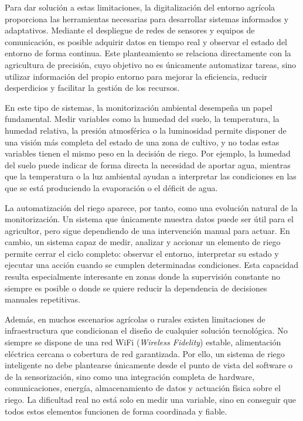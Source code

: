 Para dar solución a estas limitaciones, la digitalización del entorno agrícola proporciona las herramientas necesarias para desarrollar sistemas informados y adaptativos. Mediante el despliegue de redes de sensores y equipos de comunicación, es posible adquirir datos en tiempo real y observar el estado del entorno de forma continua. Este planteamiento se relaciona directamente con la agricultura de precisión, cuyo objetivo no es únicamente automatizar tareas, sino utilizar información del propio entorno para mejorar la eficiencia, reducir desperdicios y facilitar la gestión de los recursos.

En este tipo de sistemas, la monitorización ambiental desempeña un papel fundamental. Medir variables como la humedad del suelo, la temperatura, la humedad relativa, la presión atmosférica o la luminosidad permite disponer de una visión más completa del estado de una zona de cultivo, y no todas estas variables tienen el mismo peso en la decisión de riego. Por ejemplo, la humedad del suelo puede indicar de forma directa la necesidad de aportar agua, mientras que la temperatura o la luz ambiental ayudan a interpretar las condiciones en las que se está produciendo la evaporación o el déficit de agua.

La automatización del riego aparece, por tanto, como una evolución natural de la monitorización. Un sistema que únicamente muestra datos puede ser útil para el agricultor, pero sigue dependiendo de una intervención manual para actuar. En cambio, un sistema capaz de medir, analizar y accionar un elemento de riego permite cerrar el ciclo completo: observar el entorno, interpretar su estado y ejecutar una acción cuando se cumplen determinadas condiciones. Esta capacidad resulta especialmente interesante en zonas donde la supervisión constante no siempre es posible o donde se quiere reducir la dependencia de decisiones manuales repetitivas.

Además, en muchos escenarios agrícolas o rurales existen limitaciones de infraestructura que condicionan el diseño de cualquier solución tecnológica. No siempre se dispone de una red WiFi (\textit{Wireless Fidelity}) estable, alimentación eléctrica cercana o cobertura de red garantizada. Por ello, un sistema de riego inteligente no debe plantearse únicamente desde el punto de vista del software o de la sensorización, sino como una integración completa de hardware, comunicaciones, energía, almacenamiento de datos y actuación física sobre el riego. La dificultad real no está solo en medir una variable, sino en conseguir que todos estos elementos funcionen de forma coordinada y fiable.

